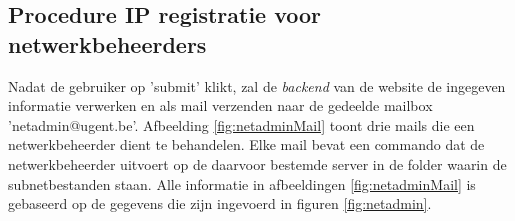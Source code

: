 \clearpage
{}


\subsection{Procedure IP registratie voor netwerkbeheerders}
Nadat de gebruiker op 'submit' klikt, zal de \textit{backend} van de website de ingegeven informatie verwerken en als mail verzenden naar de gedeelde mailbox 'netadmin@ugent.be'. Afbeelding \ref{fig:netadminMail} toont drie mails die een netwerkbeheerder dient te behandelen. Elke mail bevat een commando dat de netwerkbeheerder uitvoert op de daarvoor bestemde server in de folder waarin de subnetbestanden staan. Alle informatie in afbeeldingen \ref{fig:netadminMail} is gebaseerd op de gegevens die zijn ingevoerd in figuren \ref{fig:netadmin}.


